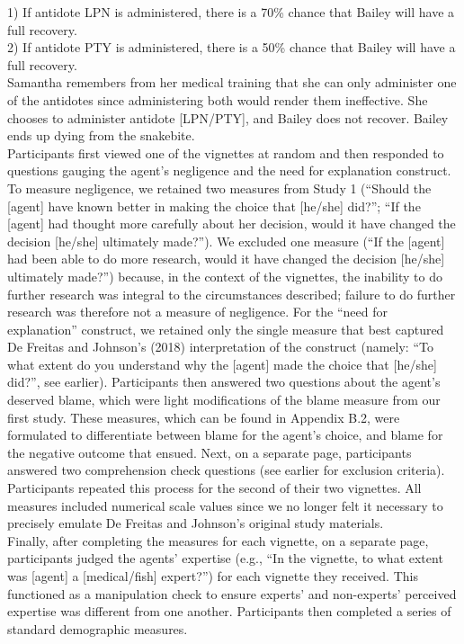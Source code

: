 \documentclass[
  man,floatsintext]{apa6}
\begin{document}
1) If antidote LPN is administered, there is a 70\% chance that Bailey will have a full recovery.\\
2) If antidote PTY is administered, there is a 50\% chance that Bailey will have a full recovery.\\
Samantha remembers from her medical training that she can only administer one of the antidotes since administering both would render them ineffective. She chooses to administer antidote {[}LPN/PTY{]}, and Bailey does not recover. Bailey ends up dying from the snakebite.\\
Participants first viewed one of the vignettes at random and then responded to questions gauging the agent's negligence and the need for explanation construct. To measure negligence, we retained two measures from Study 1 (``Should the {[}agent{]} have known better in making the choice that {[}he/she{]} did?''; ``If the {[}agent{]} had thought more carefully about her decision, would it have changed the decision {[}he/she{]} ultimately made?''). We excluded one measure (``If the {[}agent{]} had been able to do more research, would it have changed the decision {[}he/she{]} ultimately made?'') because, in the context of the vignettes, the inability to do further research was integral to the circumstances described; failure to do further research was therefore not a measure of negligence. For the ``need for explanation'' construct, we retained only the single measure that best captured De Freitas and Johnson's (2018) interpretation of the construct (namely: ``To what extent do you understand why the {[}agent{]} made the choice that {[}he/she{]} did?'', see earlier). Participants then answered two questions about the agent's deserved blame, which were light modifications of the blame measure from our first study. These measures, which can be found in Appendix B.2, were formulated to differentiate between blame for the agent's choice, and blame for the negative outcome that ensued. Next, on a separate page, participants answered two comprehension check questions (see earlier for exclusion criteria). Participants repeated this process for the second of their two vignettes. All measures included numerical scale values since we no longer felt it necessary to precisely emulate De Freitas and Johnson's original study materials.\\
Finally, after completing the measures for each vignette, on a separate page, participants judged the agents' expertise (e.g., ``In the vignette, to what extent was {[}agent{]} a {[}medical/fish{]} expert?'') for each vignette they received. This functioned as a manipulation check to ensure experts' and non-experts' perceived expertise was different from one another. Participants then completed a series of standard demographic measures.
\end{document}
